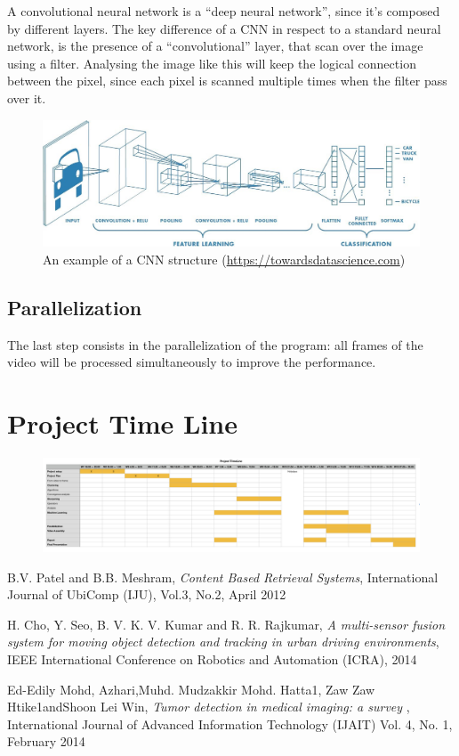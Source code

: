 \documentclass[11pt]{article}
\begin{document}
A convolutional neural network is a ``deep neural network'', since it's composed by different layers. The key difference of a CNN in respect to a standard neural network, is the presence of a ``convolutional'' layer, that scan over the image using a filter. Analysing the image like this will keep the logical connection between the pixel, since each pixel is scanned multiple times when the filter pass over it.\\
\begin{figure}[h]
	\includegraphics[width=\linewidth]{img/cnn}
	\caption{An example of a CNN structure (\url{https://towardsdatascience.com})}
\end{figure}

\subsection{Parallelization}
The last step consists in the parallelization of the program: all frames of the video will be processed simultaneously to improve the performance.


\section{Project Time Line}

\begin{figure}[h]
	\centering
	\includegraphics[scale=0.35]{./img/time}
\end{figure}

\newpage
\begin{thebibliography}{9}
	
	B.V. Patel and B.B. Meshram,
	\textit{Content Based Retrieval Systems},
	International Journal of UbiComp (IJU), Vol.3, No.2, 
	April 2012
	
	H. Cho, Y. Seo, B. V. K. V. Kumar and R. R. Rajkumar, 
	\textit{A multi-sensor fusion system for moving object detection and tracking in urban driving environments}, 
	IEEE International Conference on Robotics and Automation (ICRA), 
	2014

	Ed-Edily Mohd,  Azhari,Muhd. Mudzakkir Mohd. Hatta1, Zaw Zaw Htike1andShoon Lei Win, 
	\textit{Tumor detection in medical imaging: a survey }, 
	International Journal of Advanced Information Technology (IJAIT) Vol. 4, No. 1, 
	February 2014
	
	
	
\end{thebibliography}
\end{document}
